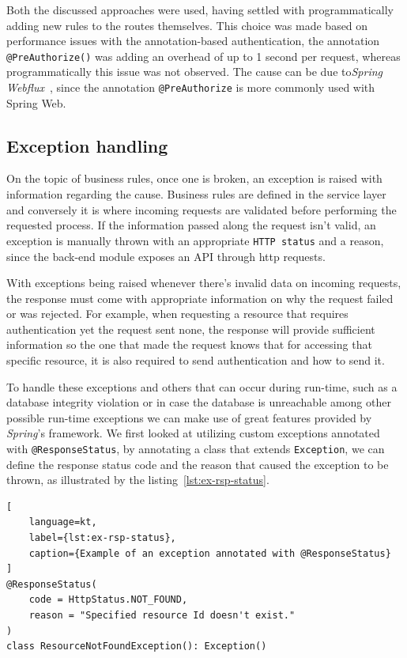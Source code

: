 Both the discussed approaches were used, having settled with programmatically adding new rules to the routes themselves. This choice was made based on performance issues with the annotation-based authentication, the annotation \texttt{@PreAuthorize()} was adding an overhead of up to 1 second per request, whereas programmatically this issue was not observed. The cause can be due to\textit{Spring Webflux}~\cite{spring-webflux}, since the annotation \texttt{@PreAuthorize} is more commonly used with Spring Web.


\subsection{Exception handling}

On the topic of business rules, once one is broken, an exception is raised with information regarding the cause. Business rules are defined in the service layer and conversely it is where incoming requests are validated before performing the requested process. If the information passed along the request isn't valid, an exception is manually thrown with an appropriate \texttt{HTTP status} and a reason, since the back-end module exposes an API through http requests. 

With exceptions being raised whenever there's invalid data on incoming requests, the response must come with appropriate information on why the request failed or was rejected. For example, when requesting a resource that requires authentication yet the request sent none, the response will provide sufficient information so the one that made the request knows that for accessing that specific resource, it is also required to send authentication and how to send it.

To handle these exceptions and others that can occur during run-time, such as a database integrity violation or in case the database is unreachable among other possible run-time exceptions we can make use of great features provided by \textit{Spring}'s framework. We first looked at utilizing custom exceptions annotated with \texttt{@ResponseStatus}, by annotating a class that extends \texttt{Exception}, we can define the response status code and the reason that caused the exception to be thrown, as illustrated by the listing~\ref{lst:ex-rsp-status}. 

\begin{lstlisting}[
    language=kt,
    label={lst:ex-rsp-status},
    caption={Example of an exception annotated with @ResponseStatus}
]
@ResponseStatus(
    code = HttpStatus.NOT_FOUND, 
    reason = "Specified resource Id doesn't exist."
)
class ResourceNotFoundException(): Exception()
\end{lstlisting}

